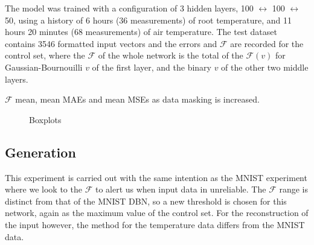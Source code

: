 The model was trained with a configuration of 3 hidden layers, 100 $\leftrightarrow$ 100 $\leftrightarrow$ 50, using a history of 6 hours (36 measurements) of root temperature, and 11 hours 20 minutes (68 measurements) of air temperature. The test dataset contains 3546 formatted input vectors and the errors and $\mathcal{F}$ are recorded for the control set, where the $\mathcal{F}$ of the whole network is the total of the $\mathcal{F}(v)$ for Gaussian-Bournouilli $v$ of the first layer, and the binary $v$ of the other two middle layers.


\begin{table}
	\begin{center}
	\end{center}
	\caption{$\mathcal{F}$ mean, mean MAEs and mean MSEs as data masking is increased.}
	\label{table:tcontrol}
\end{table}


\begin{figure}
	\begin{center}
	\end{center}
	\caption{Boxplots}
\end{figure}

\subsection{Generation}

This experiment is carried out with the same intention as the MNIST experiment where we look to the $\mathcal{F}$ to alert us when input data in unreliable. The $\mathcal{F}$ range is distinct from that of the MNIST DBN, so a new threshold is chosen for this network, again as the maximum value of the control set. For the reconstruction of the input however, the method for the temperature data differs from the MNIST data.

